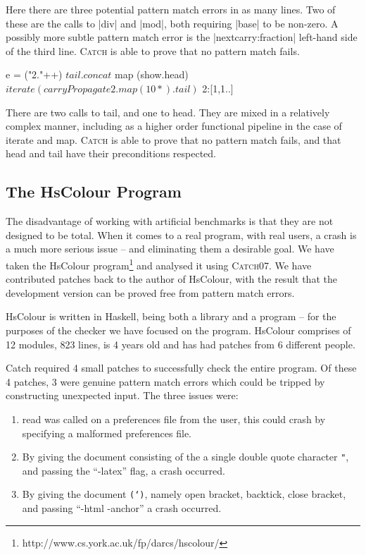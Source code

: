 \documentclass[preprint]{sigplanconf}
\newcommand{\T}[1]{\texttt{#1}}
\newcommand{\C}[1]{\textsf{#1}}
\newcommand{\catch}{\textsc{Catch}}
\begin{document}
Here there are three potential pattern match errors in as many lines. Two of these are the calls to |div| and |mod|, both requiring |base| to be non-zero. A possibly more subtle pattern match error is the |nextcarry:fraction| left-hand side of the third line. \catch{} is able to prove that no pattern match fails.

\begin{code}
e =  ("2."++) $
     tail . concat $
     map (show.head) $
     iterate (carryPropagate 2 . map (10*) . tail) $
     2:[1,1..]
\end{code}

There are two calls to \C{tail}, and one to \C{head}. They are mixed in a relatively complex manner, including as a higher order functional pipeline in the case of \C{iterate} and \C{map}. \catch{} is able to prove that no pattern match fails, and that \C{head} and \C{tail} have their preconditions respected.

\subsection{The HsColour Program}
\label{sec:hscolour}

The disadvantage of working with artificial benchmarks is that they are not designed to be total. When it comes to a real program, with real users, a crash is a much more serious issue -- and eliminating them a desirable goal. We have taken the HsColour program\footnote{http://www.cs.york.ac.uk/fp/darcs/hscolour/} and analysed it using \catch07. We have contributed patches back to the author of HsColour, with the result that the development version can be proved free from pattern match errors.

HsColour is written in Haskell, being both a library and a program -- for the purposes of the checker we have focused on the program. HsColour comprises of 12 modules, 823 lines, is 4 years old and has had patches from 6 different people.

Catch required 4 small patches to successfully check the entire program. Of these 4 patches, 3 were genuine pattern match errors which could be tripped by constructing unexpected input. The three issues were:

\begin{enumerate}
\item \C{read} was called on a preferences file from the user, this could crash by specifying a malformed preferences file.
\item By giving the document consisting of the a single double quote character \T{"}, and passing the ``-latex'' flag, a crash occurred.
\item By giving the document \T{(`)}, namely open bracket, backtick, close bracket, and passing ``-html -anchor'' a crash occurred.
\end{enumerate}
\end{document}
